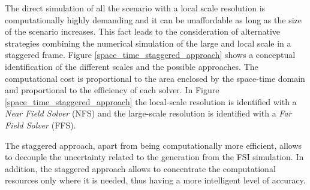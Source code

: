 The direct simulation of all the scenario with a local scale resolution is computationally highly demanding and it can be unaffordable as long as the size of the scenario increases. This fact leads to the consideration of alternative strategies combining the numerical simulation of the large and local scale in a staggered frame. Figure \ref{space_time_staggered_approach} shows a conceptual identification of the different scales and the possible approaches. The computational cost is proportional to the area enclosed by the space-time domain and proportional to the efficiency of each solver. In Figure \ref{space_time_staggered_approach} the local-scale resolution is identified with a \emph{Near Field Solver} (NFS) and the large-scale resolution is identified with a \emph{Far Field Solver} (FFS).

The staggered approach, apart from being computationally more efficient, allows to decouple the uncertainty related to the generation from the FSI simulation. In addition, the staggered approach allows to concentrate the computational resources only where it is needed, thus having a more intelligent level of accuracy.








